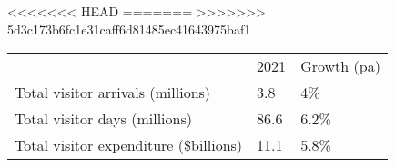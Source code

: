 <<<<<<< HEAD
=======
>>>>>>> 5d3c173b6fc1e31caff6d81485ec41643975baf1
\begin{tabular}[t]{p{4.7cm}>{\hfill}p{1.1cm}>{\hfill}p{1.7cm}}
   & 2021 & Growth (pa) \\ 
 Total visitor arrivals (millions) & 3.8 & 4\% \\ 
  Total visitor days (millions) & 86.6 & 6.2\% \\ 
  Total visitor expenditure (\$billions) & 11.1 & 5.8\% \\ 
  \end{tabular}
